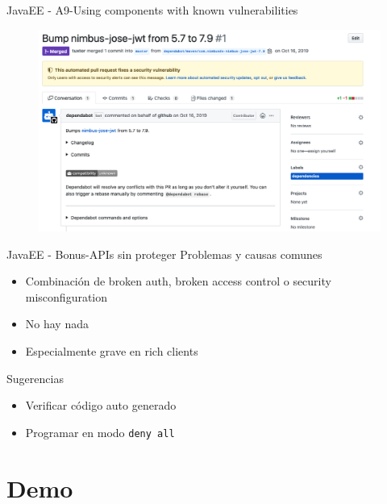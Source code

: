 \documentclass[aspectratio=169]{beamer}
\begin{document}
\begin{frame}{JavaEE - A9-Using components with known vulnerabilities}
    \begin{figure}
        \centering
        \includegraphics[width=0.9\linewidth]{Images/github}
    \end{figure}
\end{frame}

\begin{frame}{JavaEE - Bonus-APIs sin proteger}
    Problemas y causas comunes
    \begin{itemize}
        \item Combinación de broken auth, broken access control o security misconfiguration
        \item No hay nada
        \item Especialmente grave en rich clients
    \end{itemize}
    
    Sugerencias
    \begin{itemize}
        \item Verificar código auto generado
        \item Programar en modo \texttt{deny all}
    \end{itemize}
\end{frame}

{
    \section{Demo}
}
\end{document}
